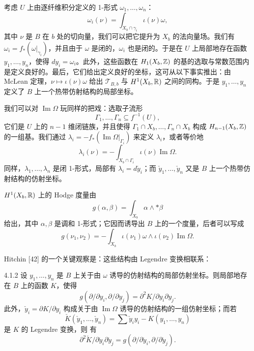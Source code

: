 考虑 $U$ 上由逐纤维积分定义的 1-形式 $\omega_1,\dots,\omega_n$：
\[
\omega_i(\nu)=\int_{X_b\cap\gamma_i}\iota(\nu)\omega,
\]
其中 $\nu$ 是 $B$ 在 $b$ 处的切向量，我们可以把它提升为 $X_b$ 的法向量场。我们有 $\omega_i=f_*(\omega|_{\gamma_i})$，并且由于 $\omega$ 是闭的，$\omega_i$ 也是闭的。于是在 $U$ 上局部地存在函数 $y_1,\dots,y_n$，使得 $dy_i=\omega_i$。此外，这些函数在 $H_1(X_b,\mathbb{Z})$ 的基的选取与常数范围内是定义良好的。最后，它们给出定义良好的坐标，这可从以下事实推出：由 McLean 定理，$\nu\mapsto\iota(\nu)\omega$ 给出 $\mathcal{T}_{B,b}$ 与 $H^1(X_b,\mathbb{R})$ 之间的同构。于是 $y_1,\dots,y_n$ 定义了 $B$ 上一个热带仿射结构的局部坐标。

我们可以对 $\operatorname{Im}\Omega$ 玩同样的把戏：选取子流形
\[
\Gamma_1,\dots,\Gamma_n\subseteq f^{-1}(U),
\]
它们是 $U$ 上的 $n-1$ 维闭链族，并且使得 $\Gamma_1\cap X_b,\dots,\Gamma_n\cap X_b$ 构成 $H_{n-1}(X_b,\mathbb{Z})$ 的一组基。我们通过 $\lambda_i=-f_*(\operatorname{Im}\Omega|_{\Gamma_i})$ 来定义 $\lambda_i$，或者等价地
\[
\lambda_i(\nu)=-\int_{X_b\cap\Gamma_i}\iota(\nu)\operatorname{Im}\Omega.
\]
同样，$\lambda_1,\dots,\lambda_n$ 是闭 1-形式，局部有 $\lambda_i=d\check y_i$；而 $\check y_1,\dots,\check y_n$ 又是 $B$ 上一个热带仿射结构的仿射坐标。

$H^1(X_b,\mathbb{R})$ 上的 Hodge 度量由
\[
g(\alpha,\beta)=\int_{X_b}\alpha\wedge\ast\beta
\]
给出，其中 $\alpha,\beta$ 是调和 1-形式；它因而诱导出 $B$ 上的一个度量，后者可以写成
\[
g(\nu_1,\nu_2)=-\int_{X_b}\iota(\nu_1)\omega\wedge\iota(\nu_2)\operatorname{Im}\Omega.
\]

Hitchin [42] 的一个关键观察是：这些结构由 Legendre 变换相联系：

\begin{proposition}{4.1.2}
设 $y_1,\dots,y_n$ 是 $B$ 上关于由 $\omega$ 诱导的仿射结构的局部仿射坐标。则局部地存在 $B$ 上的函数 $K$，使得
\[
g(\partial/\partial y_i,\partial/\partial y_j)=\partial^2K/\partial y_i\partial y_j.
\]
此外，$\check y_i=\partial K/\partial y_i$ 构成关于由 $\operatorname{Im}\Omega$ 诱导的仿射结构的一组仿射坐标；而若
\[
\check K(\check y_1,\dots,\check y_n)=\sum \check y_iy_i-K(y_1,\dots,y_n)
\]
是 $K$ 的 Legendre 变换，则
有
\[
\partial^2\check K/\partial\check y_i\partial\check y_j=g(\partial/\partial\check y_i,\partial/\partial\check y_j).
\]
\end{proposition}

